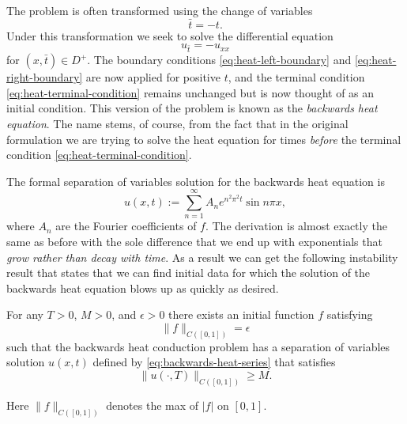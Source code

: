 The problem is often transformed using the change of variables
\begin{equation}\label{eq:heat-time-reversal}
\bar t=-t.
\end{equation}
Under this transformation we seek to solve the differential equation
\begin{equation}\label{eq:backwards-heat-equation}
u_{\bar t}=-u_{xx}
\end{equation}
for $(x,\bar t)\in D^+$. The boundary conditions \eqref{eq:heat-left-boundary} and \eqref{eq:heat-right-boundary} are now applied for positive $t$, and the terminal condition \eqref{eq:heat-terminal-condition} remains unchanged but is now thought of as an initial condition. This version of the problem is known as the \emph{backwards heat equation}. The name stems, of course, from the fact that in the original formulation we are trying to solve the heat equation for times \emph{before} the terminal condition \eqref{eq:heat-terminal-condition}.

The formal separation of variables solution for the backwards heat equation is
\begin{equation}\label{eq:backwards-heat-series}
u(x,t):=\sum_{n=1}^{\infty}A_ne^{n^2\pi^2t}\sin n\pi x,
\end{equation}
where $A_n$ are the Fourier coefficients of $f$. The derivation is almost exactly the same as before with the sole difference that we end up with exponentials that \emph{grow rather than decay with time}. As a result we can get the following instability result that states that we can find initial data for which the solution of the backwards heat equation blows up as quickly as desired.

\begin{Lemma}
\label{lem:backwards-heat-instability}
For any $T>0$, $M>0$, and $\epsilon>0$ there exists an initial function $f$ satisfying
\begin{equation}\label{eq:backwards-small-initial-norm}
\|f\|_{C([0,1])}=\epsilon
\end{equation}
such that the backwards heat conduction problem has a separation of variables solution $u(x,t)$ defined by \eqref{eq:backwards-heat-series} that satisfies
\begin{equation}\label{eq:backwards-large-terminal-norm}
\|u(\cdot,T)\|_{C([0,1])}\geq M.
\end{equation}

\end{Lemma}

Here $\|f\|_{C([0,1])}$ denotes the max of $|f|$ on $[0,1]$.

